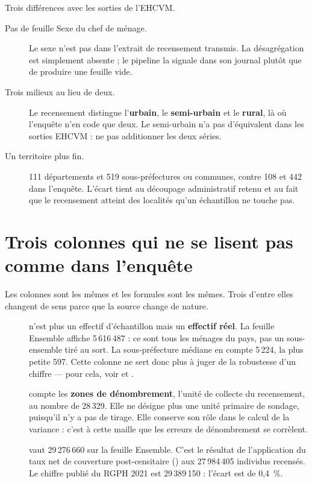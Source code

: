 \documentclass[11pt,a4paper]{article}
\begin{document}
Trois différences avec les sorties de l'EHCVM.

\begin{description}
  \item[Pas de feuille \textsf{Sexe du chef de ménage}.] Le sexe n'est pas dans l'extrait de
    recensement transmis. La désagrégation est simplement absente ; le pipeline la signale dans son
    journal plutôt que de produire une feuille vide.

  \item[Trois milieux au lieu de deux.] Le recensement distingue l'\textbf{urbain}, le
    \textbf{semi-urbain} et le \textbf{rural}, là où l'enquête n'en code que deux. Le semi-urbain
    n'a pas d'équivalent dans les sorties EHCVM : ne pas additionner les deux séries.

  \item[Un territoire plus fin.] 111 départements et 519 sous-préfectures ou communes, contre 108 et
    442 dans l'enquête. L'écart tient au découpage administratif retenu et au fait que le
    recensement atteint des localités qu'un échantillon ne touche pas.
\end{description}

\section{Trois colonnes qui ne se lisent pas comme dans l'enquête}

Les colonnes sont les mêmes et les formules sont les mêmes. Trois d'entre elles changent de sens
parce que la source change de nature.

\begin{description}
  \item[] n'est plus un effectif d'échantillon mais un \textbf{effectif réel}. La
    feuille \textsf{Ensemble} affiche 5\,616\,487 : ce sont tous les ménages du pays, pas un
    sous-ensemble tiré au sort. La sous-préfecture médiane en compte 5\,224, la plus petite 597.
    Cette colonne ne sert donc plus à juger de la robustesse d'un chiffre --- pour cela, voir
     et .

  \item[] compte les \textbf{zones de dénombrement}, l'unité de collecte du
    recensement, au nombre de 28\,329. Elle ne désigne plus une unité primaire de sondage, puisqu'il
    n'y a pas de tirage. Elle conserve son rôle dans le calcul de la variance : c'est à cette maille
    que les erreurs de dénombrement se corrèlent.

  \item[] vaut 29\,276\,660 sur la feuille \textsf{Ensemble}. C'est le résultat de
    l'application du taux net de couverture post-censitaire () aux 27\,984\,405 individus
    recensés. Le chiffre publié du RGPH 2021 est 29\,389\,150 : l'écart est de 0,4~\%.
\end{description}
\end{document}

